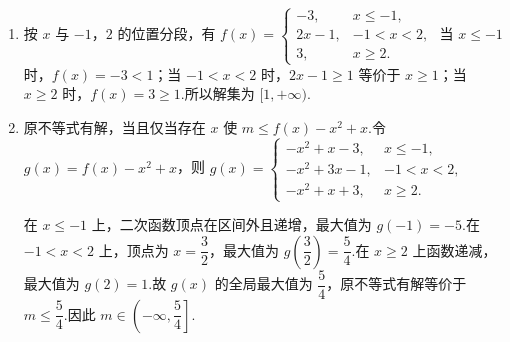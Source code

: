 \begin{solution}
\begin{enumerate}
\item 按 \(x\) 与 \(-1\)，\(2\) 的位置分段，有
\(\displaystyle f(x)=
\begin{cases}
-3,&x\leq-1,\\
2x-1,&-1<x<2,\\
3,&x\geq2.
\end{cases}\)
当 \(x\leq-1\) 时，\(f(x)=-3<1\)；当 \(-1<x<2\) 时，\(2x-1\geq1\) 等价于 \(x\geq1\)；当 \(x\geq2\) 时，\(f(x)=3\geq1\).所以解集为 \([1,+\infty)\).
\item 原不等式有解，当且仅当存在 \(x\) 使 \(m\leq f(x)-x^2+x\).令 \(g(x)=f(x)-x^2+x\)，则
\(\displaystyle g(x)=
\begin{cases}
-x^2+x-3,&x\leq-1,\\
-x^2+3x-1,&-1<x<2,\\
-x^2+x+3,&x\geq2.
\end{cases}\)

在 \(x\leq-1\) 上，二次函数顶点在区间外且递增，最大值为 \(g(-1)=-5\).在 \(-1<x<2\) 上，顶点为 \(x=\dfrac32\)，最大值为 \(g\left(\dfrac32\right)=\dfrac54\).在 \(x\geq2\) 上函数递减，最大值为 \(g(2)=1\).故 \(g(x)\) 的全局最大值为 \(\dfrac54\)，原不等式有解等价于 \(m\leq\dfrac54\).因此 \(m\in\left(-\infty,\dfrac54\right]\).
\end{enumerate}
\end{solution}
